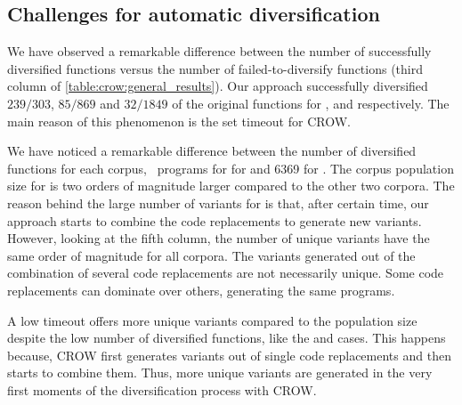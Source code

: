 




\subsection*{Challenges for automatic diversification}
\label{rq1:challenges}

We have observed a remarkable difference between the number of successfully diversified functions versus the number of failed-to-diversify functions (third column of \autoref{table:crow:general_results}). Our approach successfully diversified $239/303$, $85/869$ and $32/1849$ of the original functions for \corpusrosetta, \corpussodium and \corpusqrcode respectively.  The main reason of this phenomenon is the set timeout for CROW. 

We have noticed a remarkable difference between the number of diversified functions for each corpus, \rossetapopulation\ programs for  for \corpussodium and 6369 for \corpusqrcode. The corpus population size for \corpusrosetta is two orders of magnitude larger compared to the other two corpora. The reason behind the large number of variants for \corpusrosetta is that, after certain time, our approach starts to combine the code replacements to generate new variants. However, looking at the fifth column, the number of unique variants have the same order of magnitude for all corpora.
The variants generated out of the combination of several code replacements are not necessarily unique. Some code replacements can dominate over others, generating the same \wasm programs.

A low timeout offers more unique variants compared to the population size despite the low number of diversified functions, like the \corpussodium and \corpusqrcode cases. This happens because, CROW first generates variants out of single code replacements and then starts to combine them. Thus, more unique variants are generated in the very first moments of the diversification process with CROW.


